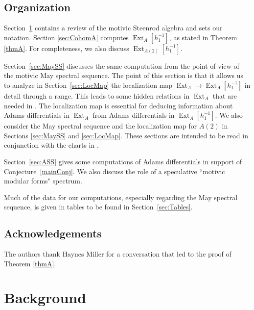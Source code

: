 \documentclass[10pt]{amsart}
\begin{document}
\subsection{Organization}

Section~\ref{sec:background} contains a review of the motivic Steenrod algebra and sets our notation. 
Section \ref{sec:CohomA} computes $\operatorname{Ext}_A[h_1^{-1}]$,
as stated in Theorem \ref{thmA}.
For completeness, we also discuss $\operatorname{Ext}_{A(2)}[h_1^{-1}]$.

Section~\ref{sec:MaySS} discusses
the same computation from the point of view of the motivic May spectral sequence. 
The point of this section is that it allows us to analyze 
in Section~\ref{sec:LocMap} the localization map
$\operatorname{Ext}_A{\longrightarrow} \operatorname{Ext}_A[h_1^{-1}]$ in detail through a range.
This leads to some hidden relations in $\operatorname{Ext}_A$ that are needed in \cite{Istems}.
The localization map is essential for deducing information about
Adams differentials in $\operatorname{Ext}_A$ from Adams differentials in $\operatorname{Ext}_A[h_1^{-1}]$.
We also consider the May spectral sequence and the localization map 
for $A(2)$ in Sections \ref{sec:MaySS} and \ref{sec:LocMap}.  
These sections are intended to be read in conjunction with the charts
in \cite{GI}.

Section~\ref{sec:ASS} gives some computations of Adams differentials in support of Conjecture~\ref{mainConj}.  We also discuss the role of a
speculative ``motivic modular forms" spectrum.

Much of the data for our computations, especially regarding the May spectral sequence, is given in tables to be found in Section~\ref{sec:Tables}.

\subsection*{Acknowledgements}

The authors thank Haynes Miller for a conversation that led to the proof
of Theorem \ref{thmA}.

\section{Background}\label{sec:background}
\end{document}

